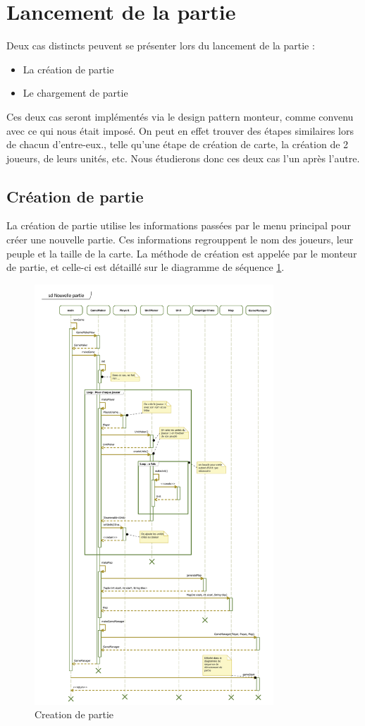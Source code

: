 \section{Lancement de la partie}
Deux cas distincts peuvent se présenter lors du lancement de la partie :
\begin{itemize}
  \item La création de partie
  \item Le chargement de partie
\end{itemize}
Ces deux cas seront implémentés via le design pattern monteur, comme convenu avec ce qui nous était imposé.
On peut en effet trouver des étapes similaires lors de chacun d'entre-eux., telle qu'une étape de création de carte, la création de 2 joueurs, de leurs unités, etc.
Nous étudierons donc ces deux cas l'un après l'autre.

\subsection{Création de partie}
La création de partie utilise les informations passées par le menu principal pour créer une nouvelle partie.
Ces informations regrouppent le nom des joueurs, leur peuple et la taille de la carte.
La méthode de création est appelée par le monteur de partie, et celle-ci est détaillé sur le diagramme de séquence \ref{fig:newGame}.
\begin{figure}[h!]
    \centering
    \includegraphics[width=0.8\textwidth]{res/NouvellePartie.png}
    \caption{Creation de partie}
    \label{fig:newGame}
\end{figure}

